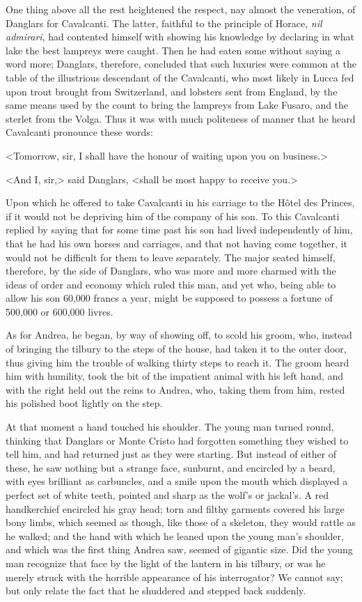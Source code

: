  One thing above all the rest heightened the respect, nay almost the veneration, of Danglars for Cavalcanti. The latter, faithful to the principle of Horace, \textit{nil admirari}, had contented himself with showing his knowledge by declaring in what lake the best lampreys were caught. Then he had eaten some without saying a word more; Danglars, therefore, concluded that such luxuries were common at the table of the illustrious descendant of the Cavalcanti, who most likely in Lucca fed upon trout brought from Switzerland, and lobsters sent from England, by the same means used by the count to bring the lampreys from Lake Fusaro, and the sterlet from the Volga. Thus it was with much politeness of manner that he heard Cavalcanti pronounce these words: 

 <Tomorrow, sir, I shall have the honour of waiting upon you on business.> 

 <And I, sir,> said Danglars, <shall be most happy to receive you.> 

 Upon which he offered to take Cavalcanti in his carriage to the Hôtel des Princes, if it would not be depriving him of the company of his son. To this Cavalcanti replied by saying that for some time past his son had lived independently of him, that he had his own horses and carriages, and that not having come together, it would not be difficult for them to leave separately. The major seated himself, therefore, by the side of Danglars, who was more and more charmed with the ideas of order and economy which ruled this man, and yet who, being able to allow his son 60,000 francs a year, might be supposed to possess a fortune of 500,000 or 600,000 livres. 

 As for Andrea, he began, by way of showing off, to scold his groom, who, instead of bringing the tilbury to the steps of the house, had taken it to the outer door, thus giving him the trouble of walking thirty steps to reach it. The groom heard him with humility, took the bit of the impatient animal with his left hand, and with the right held out the reins to Andrea, who, taking them from him, rested his polished boot lightly on the step. 

 At that moment a hand touched his shoulder. The young man turned round, thinking that Danglars or Monte Cristo had forgotten something they wished to tell him, and had returned just as they were starting. But instead of either of these, he saw nothing but a strange face, sunburnt, and encircled by a beard, with eyes brilliant as carbuncles, and a smile upon the mouth which displayed a perfect set of white teeth, pointed and sharp as the wolf's or jackal's. A red handkerchief encircled his gray head; torn and filthy garments covered his large bony limbs, which seemed as though, like those of a skeleton, they would rattle as he walked; and the hand with which he leaned upon the young man's shoulder, and which was the first thing Andrea saw, seemed of gigantic size.  Did the young man recognize that face by the light of the lantern in his tilbury, or was he merely struck with the horrible appearance of his interrogator? We cannot say; but only relate the fact that he shuddered and stepped back suddenly. 

